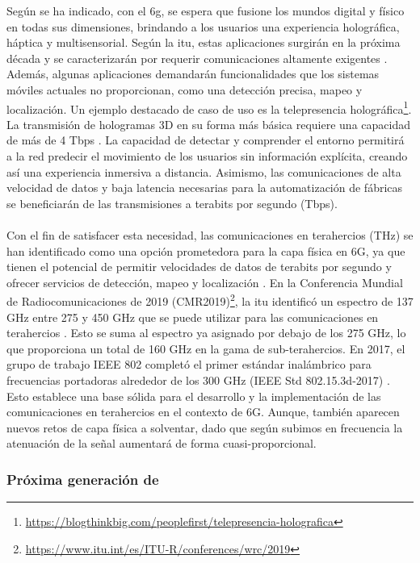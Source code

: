 Según se ha indicado, con el \gls{6g}, se espera que fusione los mundos digital y físico en todas sus dimensiones, brindando a los usuarios una experiencia holográfica, háptica y multisensorial. Según la \gls{itu}, estas aplicaciones surgirán en la próxima década y se caracterizarán por requerir comunicaciones altamente exigentes \cite{fg20192030}. Además, algunas aplicaciones demandarán funcionalidades que los sistemas móviles actuales no proporcionan, como una detección precisa, mapeo y localización. Un ejemplo destacado de caso de uso es la telepresencia holográfica\footnote{\url{https://blogthinkbig.com/peoplefirst/telepresencia-holografica}}. La transmisión de hologramas 3D en su forma más básica requiere una capacidad de más de 4 Tbps \cite{giordani2020toward}. La capacidad de detectar y comprender el entorno permitirá a la red predecir el movimiento de los usuarios sin información explícita, creando así una experiencia inmersiva a distancia. Asimismo, las comunicaciones de alta velocidad de datos y baja latencia necesarias para la automatización de fábricas se beneficiarán de las transmisiones a terabits por segundo (Tbps). \\
\\
Con el fin de satisfacer esta necesidad, las comunicaciones en terahercios (THz) se han identificado como una opción prometedora para la capa física en 6G, ya que tienen el potencial de permitir velocidades de datos de terabits por segundo y ofrecer servicios de detección, mapeo y localización \cite{latva2020key}. En la Conferencia Mundial de Radiocomunicaciones de 2019 (CMR2019)\footnote{\url{https://www.itu.int/es/ITU-R/conferences/wrc/2019}}, la \gls{itu} identificó un espectro de 137 GHz entre 275 y 450 GHz que se puede utilizar para las comunicaciones en terahercios \cite{kurner2020impact}. Esto se suma al espectro ya asignado por debajo de los 275 GHz, lo que proporciona un total de 160 GHz en la gama de sub-terahercios. En 2017, el grupo de trabajo IEEE 802 completó el primer estándar inalámbrico para frecuencias portadoras alrededor de los 300 GHz (IEEE Std 802.15.3d-2017) \cite{ieee2017ieee, petrov2020ieee}. Esto establece una base sólida para el desarrollo y la implementación de las comunicaciones en terahercios en el contexto de 6G. Aunque, también aparecen nuevos retos de capa física a solventar, dado que según subimos en frecuencia la atenuación de la señal aumentará de forma cuasi-proporcional.

\subsubsection{Próxima generación de }

